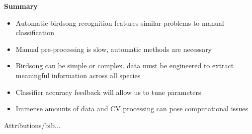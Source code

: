 \documentclass[t, xcolor={dvipsnames}]{beamer}
\begin{document}
\begin{frame}[fragile]
  \vspace{0.5cm}
  {\bfseries\Large Summary}\\
  \vspace{0.3cm}
    \begin{itemize}
      \item Automatic birdsong recognition features similar problems to manual classification
      \item Manual pre-processing is slow, automatic methods are necessary
      \item Birdsong can be simple or complex. data must be engineered to extract meaningful information across all species
      \item Classifier accuracy feedback will allow us to tune parameters
      \item Immense amounts of data and CV processing can pose computational issues
    \end{itemize}
\end{frame}

\begin{frame}[fragile]
  \vspace{0.5cm}
  \begin{addmargin}{0.5cm}
    Attributions/bib...
  \end{addmargin}
\end{frame}


\end{document}
